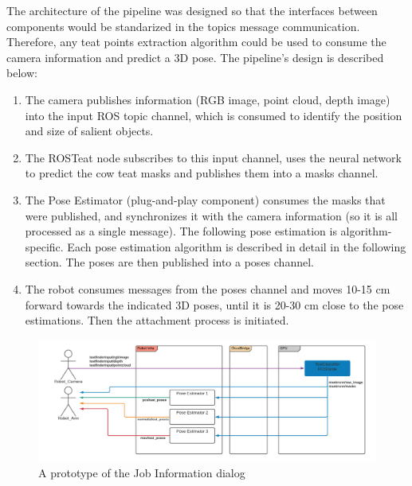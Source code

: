     
    The architecture of the pipeline was designed so that the interfaces between components would be standarized in the topics message communication. Therefore, any teat points extraction algorithm could be used to consume the camera information and predict a 3D pose. The pipeline's design is described below:
    \begin{enumerate}
        \item The camera publishes information (RGB image, point cloud, depth image) into the input ROS topic channel, which is consumed to identify the position and size of salient objects.
        \item The ROSTeat node subscribes to this input channel, uses the neural network to predict the cow teat masks and publishes them into a masks channel.
        \item The Pose Estimator (plug-and-play component) consumes the masks that were published, and synchronizes it with the camera information (so it is all processed as a single message). The following pose estimation is algorithm-specific. Each pose estimation algorithm is described in detail in the following section. The poses are then published into a poses channel.
        \item The robot consumes messages from the poses channel and moves 10-15 cm forward towards the indicated 3D poses, until it is 20-30 cm close to the pose estimations. Then the attachment process is initiated.
    \end{enumerate}
    \begin{figure}[!ht]
        \centering
        \includegraphics[width=1\textwidth]{images/cow_topics.png}
        \caption{A prototype of the Job Information dialog}
        \label{fig:cow_topics}
    \end{figure}
    
